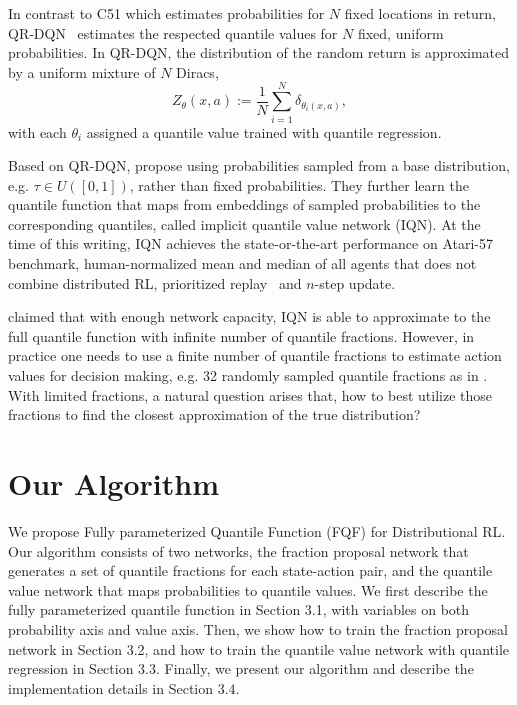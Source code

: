 \documentclass{article}
\begin{document}
In contrast to C51 which estimates probabilities for $N$ fixed locations in return, QR-DQN~\citep{dabney2018distributional} estimates the respected quantile values for $N$ fixed, uniform probabilities. In QR-DQN, the distribution of the random return is approximated by a uniform mixture of $N$ Diracs,
\begin{equation*}
    Z_{\theta}(x, a):=\frac{1}{N}\sum_{i=1}^{N}\delta_{\theta_i(x, a)},
\end{equation*}
with each $\theta_i$ assigned a quantile value trained with quantile regression.

Based on QR-DQN, \cite{dabney2018implicit} propose using probabilities sampled from a base distribution, e.g. $\tau\in U([0,1])$, rather than fixed probabilities. They further learn the quantile function that maps from embeddings of sampled probabilities to the corresponding quantiles, called implicit quantile value network (IQN). 
At the time of this writing, IQN achieves the state-or-the-art performance on Atari-57 benchmark, human-normalized mean and median of all agents that does not combine distributed RL, prioritized replay~\citep{schaul2016prioritized} and $n$-step update.

\cite{dabney2018implicit} claimed that with enough network capacity, IQN is able to approximate to the full quantile function with infinite number of quantile fractions. However, in practice one needs to use a finite number of quantile fractions to estimate action values for decision making, e.g. 32 randomly sampled quantile fractions as in \cite{dabney2018implicit}. With limited fractions, a natural question arises that, how to best utilize those fractions to find the closest approximation of the true distribution?  


\section{Our Algorithm}
We propose Fully parameterized Quantile Function (FQF) for Distributional RL. Our algorithm consists of two networks, the fraction proposal network that generates a set of quantile fractions for each state-action pair, and the quantile value network that maps probabilities to quantile values. We first describe the fully parameterized quantile function in Section 3.1, with variables on both probability axis and value axis. Then, we show how to train the fraction proposal network in Section 3.2, and how to train the quantile value network with quantile regression in Section 3.3. Finally, we present our algorithm and describe the implementation details in Section 3.4. 
\end{document}
